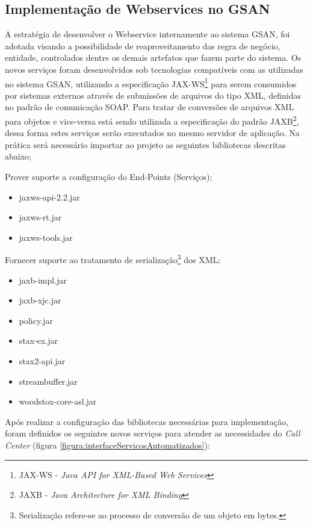 \subsection{Implementação de Webservices no GSAN}

A estratégia de desenvolver o Webservice internamente ao sistema GSAN, foi adotada visando a possibilidade de reaproveitamento das regra de negócio, entidade, controlados dentre os demais artefatos que fazem parte do sistema.  Os novos serviços foram desenvolvidos sob tecnologias compatíveis com as utilizadas no sistema GSAN, utilizando a especificação JAX-WS\footnote{JAX-WS - \textit{Java API for XML-Based Web Services}}  para serem consumidos por sistemas externos através de submissões de arquivos do tipo XML, definidas no padrão de comunicação SOAP. Para tratar de conversões de arquivos XML para objetos e vice-versa está sendo utilizada a especificação do padrão JAXB\footnote{JAXB - \textit{Java Architecture for XML Binding}}, dessa forma estes serviços serão executados no mesmo servidor de aplicação.
Na prática será necessário importar ao projeto as seguintes bibliotecas descritas abaixo;

 Prover suporte a configuração do End-Points (Serviços);
	\begin{itemize}
		\item jaxws-api-2.2.jar
		\item jaxws-rt.jar
		\item jaxws-tools.jar		
	\end{itemize}
	Fornecer suporte ao tratamento de serialização\footnote{Serialização refere-se ao processo de conversão de um objeto em bytes.} dos XML;
	\begin{itemize}
		\item jaxb-impl.jar
		\item jaxb-xjc.jar
		\item policy.jar
		\item stax-ex.jar
		\item stax2-api.jar
		\item streambuffer.jar
		\item woodstox-core-asl.jar		
	\end{itemize}


Após realizar a configuração das bibliotecas necessárias para implementação, foram definidos os seguintes novos serviços para atender as necessidades do \textit{Call Center} (figura \ref{figura:interfaceServicosAutomatizados}):


